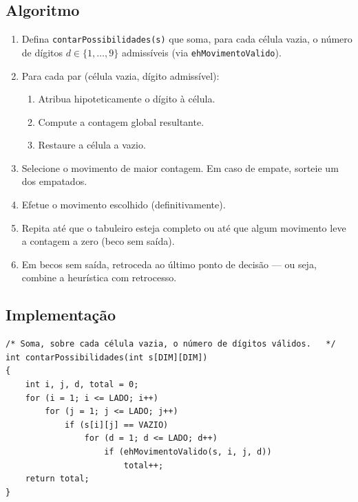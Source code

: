 \documentclass[11pt,a4paper,oneside]{report}
\newcommand{\codigo}[1]{\texttt{\color{deitelblue}#1}}
\begin{document}
\subsection{Algoritmo}

\begin{enumerate}
    \item Defina \codigo{contarPossibilidades(s)} que soma, para cada
        célula vazia, o número de dígitos $d \in \{1, \ldots, 9\}$
        admissíveis (via \codigo{ehMovimentoValido}).
    \item Para cada par (célula vazia, dígito admissível):
        \begin{enumerate}
            \item Atribua hipoteticamente o dígito à célula.
            \item Compute a contagem global resultante.
            \item Restaure a célula a vazio.
        \end{enumerate}
    \item Selecione o movimento de maior contagem. Em caso de empate,
        sorteie um dos empatados.
    \item Efetue o movimento escolhido (definitivamente).
    \item Repita até que o tabuleiro esteja completo ou até que algum
        movimento leve a contagem a zero (beco sem saída).
    \item Em becos sem saída, retroceda ao último ponto de decisão ---
        ou seja, combine a heurística com retrocesso.
\end{enumerate}

\subsection{Implementação}

\begin{lstlisting}[caption={Contagem global de possibilidades.},label={lst:cnt}]
/* Soma, sobre cada célula vazia, o número de dígitos válidos.   */
int contarPossibilidades(int s[DIM][DIM])
{
    int i, j, d, total = 0;
    for (i = 1; i <= LADO; i++)
        for (j = 1; j <= LADO; j++)
            if (s[i][j] == VAZIO)
                for (d = 1; d <= LADO; d++)
                    if (ehMovimentoValido(s, i, j, d))
                        total++;
    return total;
}
\end{lstlisting}
\end{document}
